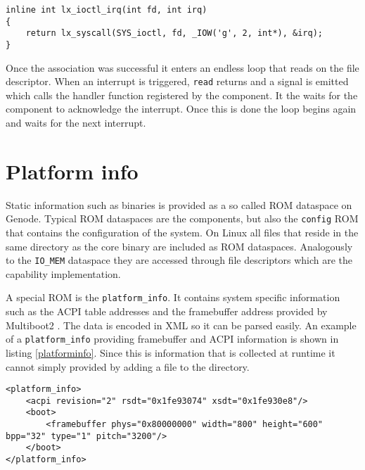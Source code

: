 \documentclass[
a4paper,
12pt,
notitlepage,
parskip=half,
DIV=11,
]{scrbook}
\begin{document}
		\begin{lstlisting}[basicstyle=\ttfamily\footnotesize]
inline int lx_ioctl_irq(int fd, int irq)
{
	return lx_syscall(SYS_ioctl, fd, _IOW('g', 2, int*), &irq);
}
		\end{lstlisting}
		
		Once the association was successful it enters an endless loop that reads on the file descriptor.
		When an interrupt is triggered, \texttt{read} returns and a signal is emitted which calls the handler function registered by the component.
		It the waits for the component to acknowledge the interrupt.
		Once this is done the loop begins again and waits for the next interrupt.
		
		\section{Platform info}
		\label{pinfo}
		
		Static information such as binaries is provided as a so called ROM dataspace on Genode.
		Typical ROM dataspaces are the components, but also the \texttt{config} ROM that contains the configuration of the system.
		On Linux all files that reside in the same directory as the core binary are included as ROM dataspaces.
		Analogously to the \texttt{IO\_MEM} dataspace they are accessed through file descriptors which are the capability implementation.
		
		A special ROM is the \texttt{platform\_info}.
		It contains system specific information such as the ACPI \citep{acpi_spec} table addresses and the framebuffer address provided by Multiboot2 \citep{multiboot2}.
		The data is encoded in XML so it can be parsed easily.
		An example of a \texttt{platform\_info} providing framebuffer and ACPI information is shown in listing \ref{platforminfo}.
		Since this is information that is collected at runtime it cannot simply provided by adding a file to the directory.
		
		\begin{lstlisting}[basicstyle=\ttfamily\footnotesize]
<platform_info>
	<acpi revision="2" rsdt="0x1fe93074" xsdt="0x1fe930e8"/>
	<boot>
		<framebuffer phys="0x80000000" width="800" height="600" bpp="32" type="1" pitch="3200"/>
	</boot>
</platform_info>
		\end{lstlisting}
		
\end{document}
